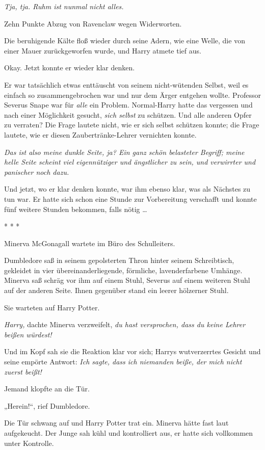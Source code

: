 {\emph{Tja, tja. Ruhm ist nunmal nicht alles.}

Zehn Punkte Abzug von Ravenclaw wegen Widerworten.

Die beruhigende Kälte floß wieder durch seine Adern, wie eine Welle, die von einer Mauer zurückgeworfen wurde, und Harry atmete tief aus.

Okay. Jetzt konnte er wieder klar denken.

Er war tatsächlich etwas enttäuscht von seinem nicht-wütenden Selbst, weil es einfach so zusammengebrochen war und nur dem Ärger entgehen wollte. Professor Severus Snape war für \emph{alle} ein Problem. Normal-Harry hatte das vergessen und nach einer Möglichkeit gesucht, \emph{sich selbst} zu schützen. Und alle anderen Opfer zu verraten? Die Frage lautete nicht, wie er sich selbst schützen konnte; die Frage lautete, wie er diesen Zaubertränke-Lehrer vernichten konnte.

\emph{Das ist also meine dunkle Seite, ja? Ein ganz schön belasteter Begriff; meine helle Seite scheint viel eigennütziger und ängstlicher zu sein, und verwirrter und panischer noch dazu.}

Und jetzt, wo er klar denken konnte, war ihm ebenso klar, was als Nächstes zu tun war. Er hatte sich schon eine Stunde zur Vorbereitung verschafft und konnte fünf weitere Stunden bekommen, falls nötig …

* * *

Minerva McGonagall wartete im Büro des Schulleiters.

Dumbledore saß in seinem gepolsterten Thron hinter seinem Schreibtisch, gekleidet in vier übereinanderliegende, förmliche, lavenderfarbene Umhänge. Minerva saß schräg vor ihm auf einem Stuhl, Severus auf einem weiteren Stuhl auf der anderen Seite. Ihnen gegenüber stand ein leerer hölzerner Stuhl.

Sie warteten auf Harry Potter.

\emph{Harry,} dachte Minerva verzweifelt, \emph{du hast versprochen, dass du keine Lehrer beißen würdest!}

Und im Kopf sah sie die Reaktion klar vor sich; Harrys wutverzerrtes Gesicht und seine empörte Antwort: \emph{Ich sagte, dass ich niemanden beiße, der mich nicht zuerst beißt!}

Jemand klopfte an die Tür.

„Herein!“, rief Dumbledore.

Die Tür schwang auf und Harry Potter trat ein. Minerva hätte fast laut aufgekeucht. Der Junge sah kühl und kontrolliert aus, er hatte sich vollkommen unter Kontrolle.

}
